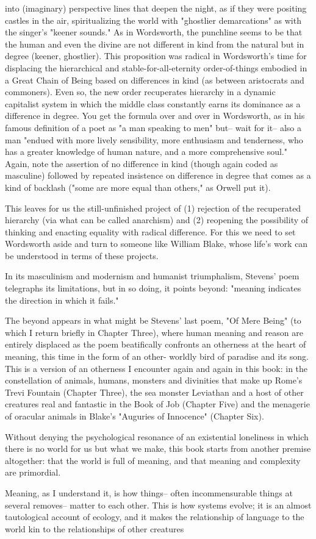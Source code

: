 \documentclass[draft]{article}
\begin{document}
into (imaginary) perspective lines that deepen the night, as if they were positing castles in the air, spiritualizing the world with "ghostlier demarcations" as with the singer's "keener sounds." As in Wordsworth, the punchline seems to be that the human and even the divine are not different in kind from the natural but in degree (keener, ghostlier). This proposition was radical in Wordsworth's time for displacing the hierarchical and stable-for-all-eternity order-of-things embodied in a Great Chain of Being based on differences in kind (as between aristocrats and commoners). Even so, the new order recuperates hierarchy in a dynamic capitalist system in which the middle class constantly earns its dominance as a difference in degree. You get the formula over and over in Wordsworth, as in his famous definition of a poet as "a man speaking to men" but-- wait for it-- also a man "endued with more lively sensibility, more enthusiasm and tenderness, who has a greater knowledge of human nature, and a more comprehensive soul." Again, note the assertion of no difference in kind (though again coded as masculine) followed by repeated insistence on difference in degree that comes as a kind of backlash ("some are more equal than others," as Orwell put it). \par This leaves for us the still-unfinished project of (1) rejection of the recuperated hierarchy (via what can be called anarchism) and (2) reopening the possibility of thinking and enacting equality with radical difference. For this we need to set Wordsworth aside and turn to someone like William Blake, whose life's work can be understood in terms of these projects. \par In its masculinism and modernism and humanist triumphalism, Stevens' poem telegraphs its limitations, but in so doing, it points beyond: "meaning indicates the direction in which it fails." \par The beyond appears in what might be Stevens' last poem, "Of Mere Being" (to which I return briefly in Chapter Three), where human meaning and reason are entirely displaced as the poem beatifically confronts an otherness at the heart of meaning, this time in the form of an other- worldly bird of paradise and its song. This is a version of an otherness I encounter again and again in this book: in the constellation of animals, humans, monsters and divinities that make up Rome's Trevi Fountain (Chapter Three), the sea monster Leviathan and a host of other creatures real and fantastic in the Book of Job (Chapter Five) and the menagerie of oracular animals in Blake's "Auguries of Innocence" (Chapter Six). \par Without denying the psychological resonance of an existential loneliness in which there is no world for us but what we make, this book starts from another premise altogether: that the world is full of meaning, and that meaning and complexity are primordial. \par Meaning, as I understand it, is how things-- often incommensurable things at several removes-- matter to each other. This is how systems evolve; it is an almost tautological account of ecology, and it makes the relationship of language to the world kin to the relationships of other creatures 
\end{document}
